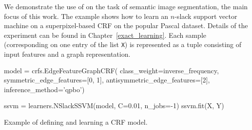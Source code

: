 %

We demonstrate the use of \pystruct on the task of semantic image segmentation,
the main focus of this work. The example shows how to learn an $n$-slack support
vector machine on a superpixel-based CRF on the popular Pascal dataset. Details of the experiment
can be found in Chapter~\ref{exact_learning}.
Each sample (corresponding on one entry of the list \texttt{X}) is represented as a
tuple consisting of input features and a graph representation.
\begin{listing}[t]
\begin{pythoncode}
model = crfs.EdgeFeatureGraphCRF(
            class_weight=inverse_frequency,
            symmetric_edge_features=[0, 1],
            antisymmetric_edge_features=[2],
            inference_method='qpbo')

ssvm = learners.NSlackSSVM(model, C=0.01, n_jobs=-1)
ssvm.fit(X, Y)
\end{pythoncode}
\caption{Example of defining and learning a CRF model.\label{lst:stuff}}
\end{listing}

